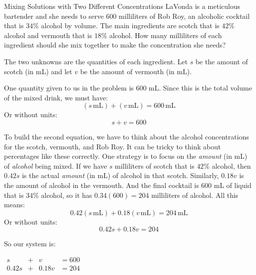 \documentclass[nooutcomes]{ximera}
\begin{document}
 \begin{example}{Mixing Solutions with Two Different Concentrations}
          LaVonda is a meticulous bartender and she needs to serve $600$ milliliters of Rob Roy,
          an alcoholic cocktail that is $34\%$ alcohol by volume.
          The main ingredients are scotch that is $42\%$ alcohol and vermouth that is $18\%$ alcohol.
          How many milliliters of each ingredient should she mix together to make the concentration she needs?
\begin{explanation}
          The two unknowns are the quantities of each ingredient.
          Let $s$ be the amount of scotch (in
         mL) and let $v$ be the amount of vermouth
          (in
        mL).
    


          One quantity given to us in the problem is     $600$ mL.
          Since this is the total volume of the mixed drink, we must have:
          \[
            (s\,\text{mL})+(v\,\text{mL})=600\,\text{mL}
        \]
          Or without units:
         \[
            s+v=600
        \]
      
          To build the second equation,
          we have to think about the alcohol concentrations for the scotch,
          vermouth,
          and Rob Roy.
          It can be tricky to think about percentages like these correctly.
          One strategy is to focus on the \textit{amount} (in
        mL) of \textit{alcohol} being mixed.
          If we have $s$ milliliters of scotch that is $42\%$ alcohol,
          then $0.42s$ is the actual \textit{amount} (in
       mL) of alcohol in that scotch.
          Similarly, $0.18v$ is the amount of alcohol in the vermouth.
          And the final cocktail is
          $600$ mL
          of liquid that is $34\%$ alcohol,
          so it has $0.34(600)=204$ milliliters of alcohol.
          All this means:
          \[
            0.42(s\,\text{mL})+0.18(v\,\text{mL})=204\,\text{mL}
          \]
          Or without units:
       \[
            0.42s+0.18v=204
         \]

      
          So our system is:
\begin{center}
$
            \begin{array}{cccc}
            s&+& v&=600 \\
            0.42s&+&0.18v&=204
            \end{array}
      $
\end{center}


\end{explanation}
\end{example}
\end{document}
